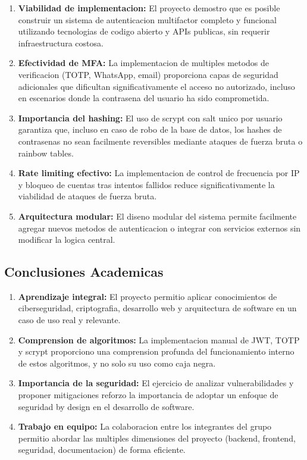 \documentclass[12pt,a4paper]{article}
\begin{document}
\begin{enumerate}[leftmargin=*, itemsep=3pt]
    \item \textbf{Viabilidad de implementacion:} El proyecto demostro que es posible construir un sistema de autenticacion multifactor completo y funcional utilizando tecnologias de codigo abierto y APIs publicas, sin requerir infraestructura costosa.
    \item \textbf{Efectividad de MFA:} La implementacion de multiples metodos de verificacion (TOTP, WhatsApp, email) proporciona capas de seguridad adicionales que dificultan significativamente el acceso no autorizado, incluso en escenarios donde la contrasena del usuario ha sido comprometida.
    \item \textbf{Importancia del hashing:} El uso de scrypt con salt unico por usuario garantiza que, incluso en caso de robo de la base de datos, los hashes de contrasenas no sean facilmente reversibles mediante ataques de fuerza bruta o rainbow tables.
    \item \textbf{Rate limiting efectivo:} La implementacion de control de frecuencia por IP y bloqueo de cuentas tras intentos fallidos reduce significativamente la viabilidad de ataques de fuerza bruta.
    \item \textbf{Arquitectura modular:} El diseno modular del sistema permite facilmente agregar nuevos metodos de autenticacion o integrar con servicios externos sin modificar la logica central.
\end{enumerate}

\subsection{Conclusiones Academicas}

\begin{enumerate}[leftmargin=*, itemsep=3pt]
    \item \textbf{Aprendizaje integral:} El proyecto permitio aplicar conocimientos de ciberseguridad, criptografia, desarrollo web y arquitectura de software en un caso de uso real y relevante.
    \item \textbf{Comprension de algoritmos:} La implementacion manual de JWT, TOTP y scrypt proporciono una comprension profunda del funcionamiento interno de estos algoritmos, y no solo su uso como caja negra.
    \item \textbf{Importancia de la seguridad:} El ejercicio de analizar vulnerabilidades y proponer mitigaciones reforzo la importancia de adoptar un enfoque de seguridad by design en el desarrollo de software.
    \item \textbf{Trabajo en equipo:} La colaboracion entre los integrantes del grupo permitio abordar las multiples dimensiones del proyecto (backend, frontend, seguridad, documentacion) de forma eficiente.
\end{enumerate}
\end{document}

